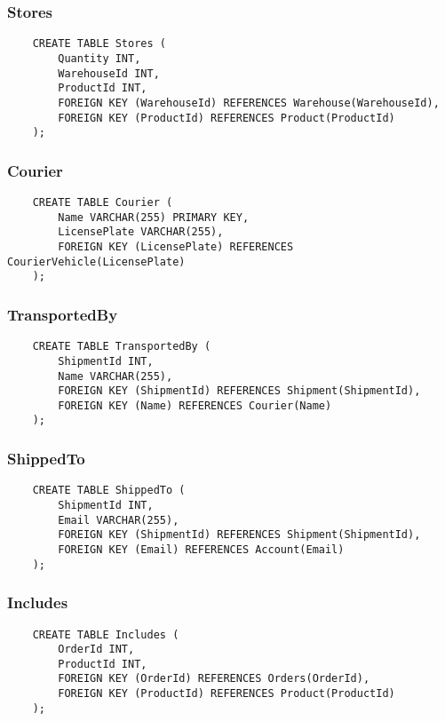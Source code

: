 \subsubsection{Stores}

\begin{lstlisting}
    CREATE TABLE Stores (
        Quantity INT,
        WarehouseId INT,
        ProductId INT,
        FOREIGN KEY (WarehouseId) REFERENCES Warehouse(WarehouseId),
        FOREIGN KEY (ProductId) REFERENCES Product(ProductId)
    );
\end{lstlisting}

\subsubsection{Courier}

\begin{lstlisting}
    CREATE TABLE Courier (
        Name VARCHAR(255) PRIMARY KEY,
        LicensePlate VARCHAR(255),
        FOREIGN KEY (LicensePlate) REFERENCES CourierVehicle(LicensePlate)
    );
\end{lstlisting}

\subsubsection{TransportedBy}

\begin{lstlisting}
    CREATE TABLE TransportedBy (
        ShipmentId INT,
        Name VARCHAR(255),
        FOREIGN KEY (ShipmentId) REFERENCES Shipment(ShipmentId),
        FOREIGN KEY (Name) REFERENCES Courier(Name)
    );
\end{lstlisting}

\subsubsection{ShippedTo}

\begin{lstlisting}
    CREATE TABLE ShippedTo (
        ShipmentId INT,
        Email VARCHAR(255),
        FOREIGN KEY (ShipmentId) REFERENCES Shipment(ShipmentId),
        FOREIGN KEY (Email) REFERENCES Account(Email)
    );
\end{lstlisting}

\subsubsection{Includes}

\begin{lstlisting}
    CREATE TABLE Includes (
        OrderId INT,
        ProductId INT,
        FOREIGN KEY (OrderId) REFERENCES Orders(OrderId),
        FOREIGN KEY (ProductId) REFERENCES Product(ProductId)
    );
\end{lstlisting}

